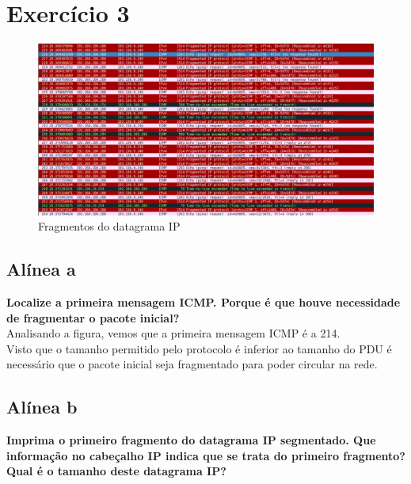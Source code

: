 \documentclass[a4paper]{report}
\begin{document}
\section{Exercício 3}

\begin{figure}[H]
    \centering 
    \includegraphics[width=\textwidth]{images/datagramaIpEx3.png}
    \caption{Fragmentos do datagrama IP}
    \label{fig:datagramaIpEx3}
\end{figure}
\subsection{Alínea a}
\textbf{Localize a primeira mensagem ICMP. Porque é que houve necessidade de
fragmentar o pacote inicial?}\\
Analisando a figura, vemos que a primeira mensagem ICMP é a 214.\\
Visto que o tamanho permitido pelo protocolo é inferior ao tamanho do PDU é
necessário que o pacote inicial seja fragmentado para poder circular na rede.

\subsection{Alínea b}
\textbf{Imprima o primeiro fragmento do datagrama IP segmentado. Que informação
no cabeçalho IP indica que se trata do primeiro fragmento? Qual é o tamanho
deste datagrama IP?}
\end{document}
